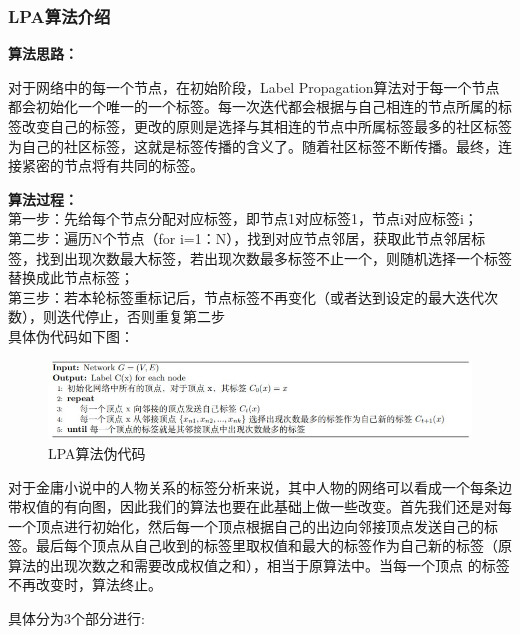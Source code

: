 \documentclass[a4paper,UTF8]{article}
\numberwithin{equation}{section}
\begin{document}
\subsubsection{LPA算法介绍}
\textbf{算法思路：}\par
对于网络中的每一个节点，在初始阶段，Label Propagation算法对于每一个节点都会初始化一个唯一的一个标签。每一次迭代都会根据与自己相连的节点所属的标签改变自己的标签，更改的原则是选择与其相连的节点中所属标签最多的社区标签为自己的社区标签，这就是标签传播的含义了。随着社区标签不断传播。最终，连接紧密的节点将有共同的标签。\par
\textbf{算法过程：}\\
第一步：先给每个节点分配对应标签，即节点1对应标签1，节点i对应标签i；\\
第二步：遍历N个节点（for i=1：N），找到对应节点邻居，获取此节点邻居标签，找到出现次数最大标签，若出现次数最多标签不止一个，则随机选择一个标签替换成此节点标签；\\
第三步：若本轮标签重标记后，节点标签不再变化（或者达到设定的最大迭代次数），则迭代停止，否则重复第二步\\
具体伪代码如下图：
\begin{figure}[H]
    \centering

    \includegraphics[width = 15cm]{LPAcode.jpg}

    \caption{LPA算法伪代码}
\end{figure}
对于金庸小说中的人物关系的标签分析来说，其中人物的网络可以看成一个每条边带权值的有向图，因此我们的算法也要在此基础上做一些改变。首先我们还是对每一个顶点进行初始化，然后每一个顶点根据自己的出边向邻接顶点发送自己的标签。最后每个顶点从自己收到的标签里取权值和最大的标签作为自己新的标签（原算法的出现次数之和需要改成权值之和），相当于原算法中。当每一个顶点 的标签不再改变时，算法终止。\par
具体分为3个部分进行:
\end{document}
